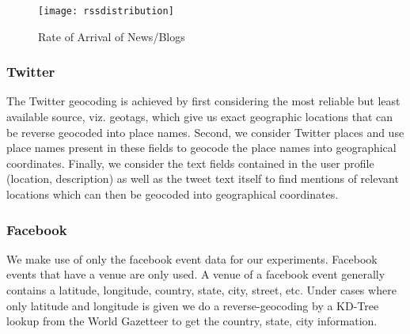 \begin{figure}
    \texttt{[image: rssdistribution]}
    \caption{Rate of Arrival of News/Blogs}
    \label{fig:rssdistribution}
\end{figure}

\subsubsection{Twitter}
The Twitter\cite{twitter} geocoding is achieved by first
considering the most reliable but least available source,
viz. geotags, which give us exact geographic locations that can be
reverse geocoded into place names.  Second, we consider Twitter places
and use place names present in these fields to geocode the place names
into geographical coordinates.  Finally, we consider the text fields
contained in the user profile (location, description) as well as the
tweet text itself to find mentions of relevant locations which can
then be geocoded into geographical coordinates.

\subsubsection{Facebook}
We make use of only the facebook event data for our experiments. Facebook events that have a venue are only used. A venue of a facebook event generally contains a latitude, longitude, country, state, city, street, etc. Under cases where only latitude and longitude is given we do a reverse-geocoding by a KD-Tree lookup\cite{kd-tree} from the World Gazetteer to get the country, state, city information. 
